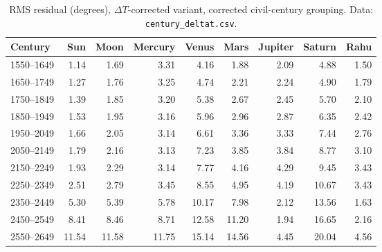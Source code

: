 \documentclass[11pt,a4paper]{article}
\newcommand{\toprule}{\hline\hline}%
\newcommand{\midrule}{\hline}%
\newcommand{\bottomrule}{\hline\hline}}
\newcommand{\dT}{$\Delta T$}
\newcommand{\file}[1]{\texttt{#1}}
\begin{document}
\begin{table}[htbp]
\centering
\caption{RMS residual (degrees), \dT{}-corrected variant, corrected civil-century grouping. Data: \file{century\_deltat.csv}.}
\label{tab:rms}
\small
\begin{tabular}{@{}lrrrrrrrr@{}}
\toprule
Century & Sun & Moon & Mercury & Venus & Mars & Jupiter & Saturn & Rahu \\
\midrule
1550--1649 & 1.14 & 1.69 & 3.31 & 4.16 & 1.88 & 2.09 & 4.88 & 1.50 \\
1650--1749 & 1.27 & 1.76 & 3.25 & 4.74 & 2.21 & 2.24 & 4.90 & 1.79 \\
1750--1849 & 1.39 & 1.85 & 3.20 & 5.38 & 2.67 & 2.45 & 5.70 & 2.10 \\
1850--1949 & 1.53 & 1.95 & 3.16 & 5.96 & 2.96 & 2.87 & 6.35 & 2.42 \\
1950--2049 & 1.66 & 2.05 & 3.14 & 6.61 & 3.36 & 3.33 & 7.44 & 2.76 \\
2050--2149 & 1.79 & 2.16 & 3.13 & 7.23 & 3.85 & 3.84 & 8.77 & 3.10 \\
2150--2249 & 1.93 & 2.29 & 3.14 & 7.77 & 4.16 & 4.29 & 9.45 & 3.43 \\
2250--2349 & 2.51 & 2.79 & 3.45 & 8.55 & 4.95 & 4.19 & 10.67 & 3.43 \\
2350--2449 & 5.30 & 5.39 & 5.78 & 10.17 & 7.98 & 2.12 & 13.56 & 1.63 \\
2450--2549 & 8.41 & 8.46 & 8.71 & 12.58 & 11.20 & 1.94 & 16.65 & 2.16 \\
2550--2649 & 11.54 & 11.58 & 11.75 & 15.14 & 14.56 & 4.45 & 20.04 & 4.56 \\
\bottomrule
\end{tabular}
\end{table}
\end{document}
